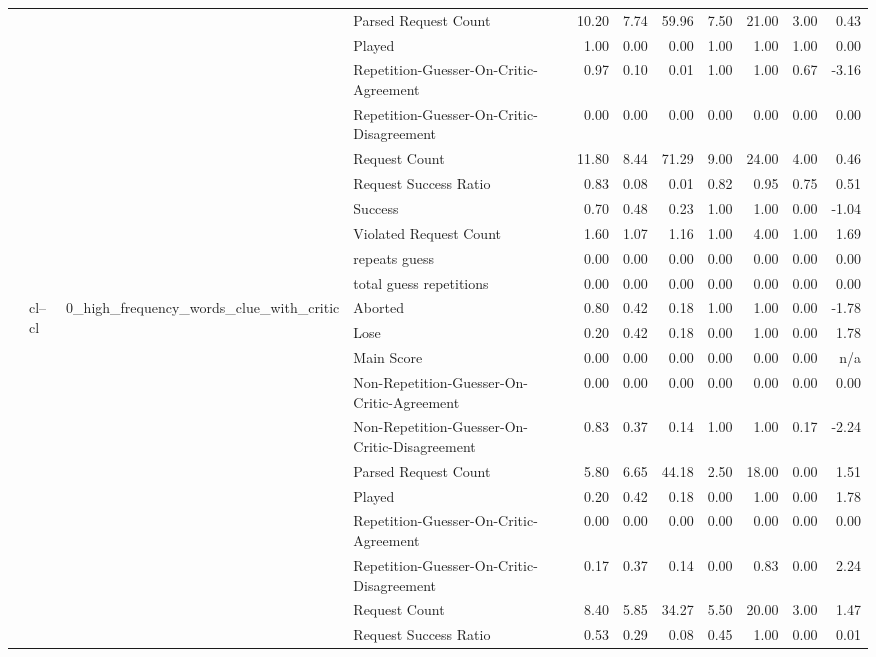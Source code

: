 \begin{tabular}{llllrrrrrrr}
 &  &  & Parsed Request Count & 10.20 & 7.74 & 59.96 & 7.50 & 21.00 & 3.00 & 0.43 \\
 &  &  & Played & 1.00 & 0.00 & 0.00 & 1.00 & 1.00 & 1.00 & 0.00 \\
 &  &  & Repetition-Guesser-On-Critic-Agreement & 0.97 & 0.10 & 0.01 & 1.00 & 1.00 & 0.67 & -3.16 \\
 &  &  & Repetition-Guesser-On-Critic-Disagreement & 0.00 & 0.00 & 0.00 & 0.00 & 0.00 & 0.00 & 0.00 \\
 &  &  & Request Count & 11.80 & 8.44 & 71.29 & 9.00 & 24.00 & 4.00 & 0.46 \\
 &  &  & Request Success Ratio & 0.83 & 0.08 & 0.01 & 0.82 & 0.95 & 0.75 & 0.51 \\
 &  &  & Success & 0.70 & 0.48 & 0.23 & 1.00 & 1.00 & 0.00 & -1.04 \\
 &  &  & Violated Request Count & 1.60 & 1.07 & 1.16 & 1.00 & 4.00 & 1.00 & 1.69 \\
 &  &  & repeats guess & 0.00 & 0.00 & 0.00 & 0.00 & 0.00 & 0.00 & 0.00 \\
 &  &  & total guess repetitions & 0.00 & 0.00 & 0.00 & 0.00 & 0.00 & 0.00 & 0.00 \\
\cline{2-11} \cline{3-11}
 & \multirow[t]{45}{*}{cl--cl} & \multirow[t]{15}{*}{0_high_frequency_words_clue_with_critic} & Aborted & 0.80 & 0.42 & 0.18 & 1.00 & 1.00 & 0.00 & -1.78 \\
 &  &  & Lose & 0.20 & 0.42 & 0.18 & 0.00 & 1.00 & 0.00 & 1.78 \\
 &  &  & Main Score & 0.00 & 0.00 & 0.00 & 0.00 & 0.00 & 0.00 & n/a \\
 &  &  & Non-Repetition-Guesser-On-Critic-Agreement & 0.00 & 0.00 & 0.00 & 0.00 & 0.00 & 0.00 & 0.00 \\
 &  &  & Non-Repetition-Guesser-On-Critic-Disagreement & 0.83 & 0.37 & 0.14 & 1.00 & 1.00 & 0.17 & -2.24 \\
 &  &  & Parsed Request Count & 5.80 & 6.65 & 44.18 & 2.50 & 18.00 & 0.00 & 1.51 \\
 &  &  & Played & 0.20 & 0.42 & 0.18 & 0.00 & 1.00 & 0.00 & 1.78 \\
 &  &  & Repetition-Guesser-On-Critic-Agreement & 0.00 & 0.00 & 0.00 & 0.00 & 0.00 & 0.00 & 0.00 \\
 &  &  & Repetition-Guesser-On-Critic-Disagreement & 0.17 & 0.37 & 0.14 & 0.00 & 0.83 & 0.00 & 2.24 \\
 &  &  & Request Count & 8.40 & 5.85 & 34.27 & 5.50 & 20.00 & 3.00 & 1.47 \\
 &  &  & Request Success Ratio & 0.53 & 0.29 & 0.08 & 0.45 & 1.00 & 0.00 & 0.01 \\

\end{tabular}
